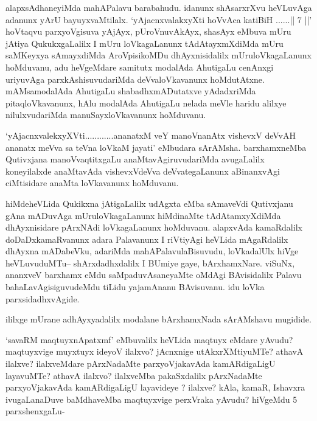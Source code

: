 \begin{artha}
alapxsAdhaneyiMda mahAPalavu barabahudu. idanunx shAsarxrXvu heVLuvAga adanunx yArU bayuyxvaMtilalx. `yAjacnxvalakxyXti hoVvAca katiBiH ......|| 7 ||' hoVtaqvu parxyoVgisuva yAjAyx, pUroVnuvAkAyx, shasAyx eMbuva mUru \-jAtiya QukukxgaLalilx I mUru loVkagaLanunx tAdAtayxmXdiMda  mUru saMKeyxya sAmayxdiMda AroVpisikoMDu dhAyxnisidalilx mUruloVkagaLanunx hoMduvanu, adu heVgeMdare samitutx modalAda AhutigaLu cenAnxgi uriyuvAga parxkAshisuvu\-dariMda deVvaloVkavanunx hoMdutAtxne. mAMsamodalAda AhutigaLu shabadhx\break mADutatxve yAdadxriMda pitaqloVkavanunx, hAlu modalAda AhutigaLu nelada meVle haridu alilxye nilulxvudariMda manuSayxloVkavanunx hoMduvanu.

`yAjacnxvalekxyXVti............ananatxM veY manoV\s nanAtx vishevxV deVvAH ananatx meVva sa teVna loVkaM jayati' eMbudara sArAMsha. barxhamxneMba Qutivxjana manoVvaqtitxgaLu 
anaMtavAgiruvudariMda avugaLalilx koneyilalxde anaMtavAda vishevxVdeVva deVvategaLanunx 
aBinanxvAgi ciMtisidare anaMta loVkavanunx hoMduvanu.
\end{artha}

\centerline{}

\begin{artha}
hiMdeheVLida  Qukikxna jAtigaLalilx udAgxta eMba sAmaveVdi Qutivxjanu  gAna mADuvAga mUruloVkagaLanunx hiMdinaMte tAdAtamxyXdiMda dhAyxnisidare pArxNAdi loVkagaLanunx hoMduvanu. alapxvAda kamaRdalilx doDaDxkamaRvanunx adara Palavanunx I riVtiyAgi heVLida mAgaRdalilx dhAyxna mADabeVku, adariMda mahAPalavulaBisuvudu, loVkadalUlx hiVge heVLuvuduMTu-- shArxdadhxdalilx I BUmiye gaye, bArxhamxNare. viSuNx, ananxveV barxhamx eMdu saMpaduvAsaneyaMte oMdAgi BAvisidalilx Palavu bahaLavAgisiguvudeMdu tiLidu yajamAnanu BAvisuvanu. idu loVka parxsidadhxvAgide.
\end{artha}

\begin{artha}ililxge mUrane adhAyxyadalilx modalane bArxhamxNada sArAMshavu mugidide.\end{artha}


\begin{artha}
`savaRM maqtuyxnA\s \s patxmf' eMbuvalilx heVLida maqtuyx eMdare yAvudu? maqtuyxvige muyxtuyx ideyoV ilalxvo? jAcnxnige  utAkxrXMtiyuMTe? athavA ilalxve? ilalxveMdare pArxNadaMte parxyoVjakavAda kamARdigaLigU layavuMTe? athavA ilalxvo? ilalxveMba pakaSxdalilx pArxNadaMte parxyoVjakavAda kamARdigaLigU laya\-videye ? ilalxve?  kAla, kamaR, Ishavxra ivugaLanaDuve baMdhaveMba maqtuyxvige perxVraka yAvudu? hiVgeMdu 5 parxshenxgaLu-
\end{artha}

